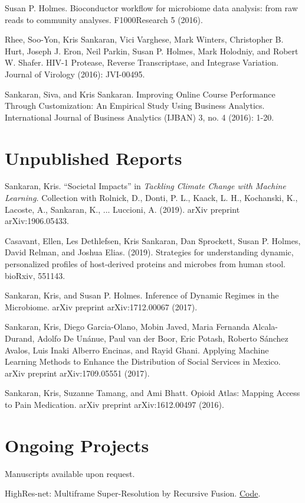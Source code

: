 \documentclass[letterpaper]{article}
\renewenvironment{itemize}{
  \begin{list}{}{
    \setlength{\leftmargin}{1.5em}
  }
}{
  \end{list}
}
\begin{document}
\begin{itemize}
\begin{itemize}
    Susan P. Holmes. Bioconductor workflow for microbiome data analysis: from
    raw reads to community analyses. F1000Research 5 (2016).
  \item Rhee, Soo-Yon, Kris Sankaran, Vici Varghese, Mark Winters, Christopher B.
    Hurt, Joseph J. Eron, Neil Parkin, Susan P. Holmes, Mark Holodniy, and Robert
    W. Shafer. HIV-1 Protease, Reverse Transcriptase, and Integrase Variation.
    Journal of Virology (2016): JVI-00495.
  \item Sankaran, Siva, and Kris Sankaran. Improving Online Course Performance
    Through Customization: An Empirical Study Using Business Analytics.
    International Journal of Business Analytics (IJBAN) 3, no. 4 (2016): 1-20.
  \end{itemize}
\end{itemize}

\section*{Unpublished Reports}
\begin{itemize}
\item Sankaran, Kris. ``Societal Impacts'' in 
\textit{Tackling Climate Change with Machine Learning.} Collection with Rolnick, D., Donti, P. L., Kaack, L. H., Kochanski, K., Lacoste, A., Sankaran, K., ... Luccioni, A. (2019). arXiv preprint arXiv:1906.05433.
\item Casavant, Ellen, Les Dethlefsen, Kris Sankaran, Dan Sprockett, Susan P. Holmes, David Relman, and Joshua Elias. (2019). Strategies for understanding dynamic, personalized profiles of host-derived proteins and microbes from human stool. bioRxiv, 551143.
 \item Sankaran, Kris, and Susan P. Holmes. Inference of Dynamic Regimes in
   the Microbiome. arXiv preprint arXiv:1712.00067 (2017).
  \item Sankaran, Kris, Diego Garcia-Olano, Mobin Javed, Maria Fernanda
    Alcala-Durand, Adolfo De Unánue, Paul van der Boor, Eric Potash, Roberto
    S\'anchez Avalos, Luis Inaki Alberro Encinas, and Rayid Ghani. Applying
    Machine Learning Methods to Enhance the Distribution of Social Services in
    Mexico. arXiv preprint arXiv:1709.05551 (2017).
  \item Sankaran, Kris, Suzanne Tamang, and Ami Bhatt. Opioid Atlas: Mapping
    Access to Pain Medication. arXiv preprint arXiv:1612.00497 (2016).
\end{itemize}

\section*{Ongoing Projects}
Manuscripts available upon request.
\begin{itemize}
\item HighRes-net: Multiframe Super-Resolution by Recursive Fusion.  
\href{https://github.com/ElementAI/HighRes-net}{Code}.
\end{itemize}
\end{document}
